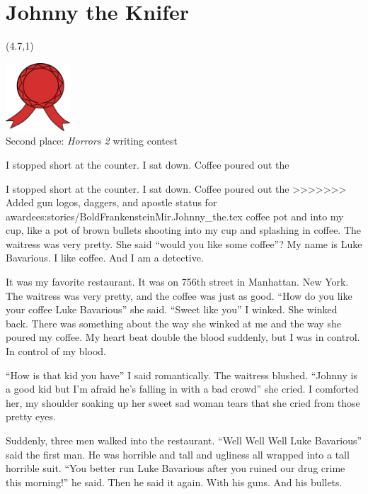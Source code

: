 \chapter{Johnny the Knifer \textdagger \textdagger}

\begin{textblock}{1.5}(4.7,1)
\begin{center}
\includegraphics[height=1in]{art/red-ribbon.pdf} \\
{\scriptsize Second place: {\em Horrors 2} writing contest}
\end{center}
\end{textblock}

\noindent I stopped short at the counter. I sat down. Coffee poured out the

I stopped short at the counter. I sat down. Coffee poured out the
>>>>>>> Added gun logos, daggers, and apostle status for awardees:stories/BoldFrankensteinMir.Johnny_the.tex
coffee pot and into my cup, like a pot of brown bullets shooting
into my cup and splashing in coffee. The waitress was very pretty.
She said ``would you like some coffee''? My name is Luke Bavarious. I
like coffee. And I am a detective.



It was my favorite restaurant. It was on 756th street in Manhattan.
New York. The waitress was very pretty, and the coffee was just as
good. ``How do you like your coffee Luke Bavarious'' she said. ``Sweet
like you'' I winked. She winked back. There was something about the
way she winked at me and the way she poured my coffee. My heart
beat double the blood suddenly, but I was in control. In control of
my blood.



``How is that kid you have'' I said romantically. The waitress
blushed. ``Johnny is a good kid but I'm afraid he's falling in with
a bad crowd'' she cried. I comforted her, my shoulder soaking up her
sweet sad woman tears that she cried from those pretty eyes.



Suddenly, three men walked into the restaurant. ``Well Well Well
Luke Bavarious'' said the first man. He was horrible and tall and
ugliness all wrapped into a tall horrible suit. ``You better run
Luke Bavarious after you ruined our drug crime this morning!'' he
said. Then he said it again. With his guns. And his bullets.



